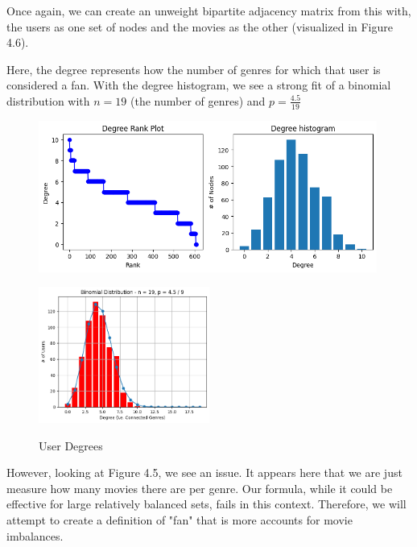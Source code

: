\documentclass[12pt]{article}
\numberwithin{equation}{section}
\begin{document}
Once again, we can create an unweight bipartite adjacency matrix from this with, the users as one set of nodes and the movies as the other (visualized in Figure 4.6).

Here, the degree represents how the number of genres for which that user is considered a fan. With the degree histogram, we see a strong fit of a binomial distribution with $n = 19$ (the number of genres) and $p = \frac{4.5}{19}$

\begin{figure}[h!]
    \begin{minipage}[b]{1\linewidth}
         \centering
  	\includegraphics[width=0.99\textwidth]{genre_degree1.png}
  	\label{fig:fanspergenre}
	 \caption{User Degrees}
    \end{minipage}
    \vspace{0.1cm}
    \begin{minipage}[b]{1\linewidth}
         \centering
  	\includegraphics[width=0.5\textwidth]{binomialfit.png}
  	\label{fig:fanspergenre}
    \end{minipage}
\end{figure}

However, looking at Figure 4.5, we see an issue. It appears here that we are just measure how many movies there are per genre. Our formula, while it could be effective for large relatively balanced sets, fails in this context. Therefore, we will attempt to create a definition of "fan" that is more accounts for movie imbalances.
\end{document}
